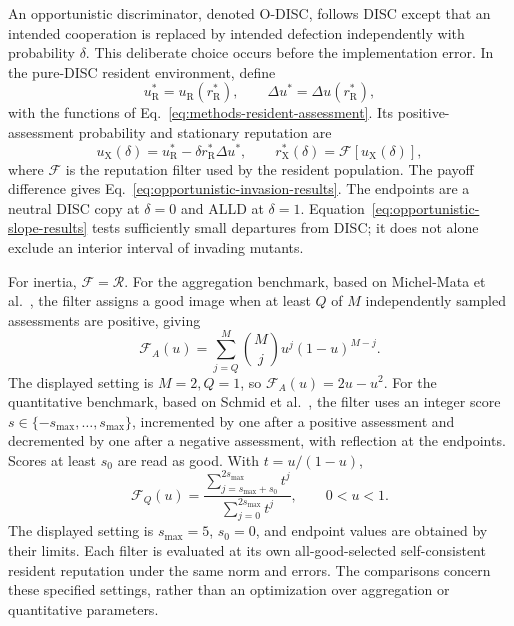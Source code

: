 \documentclass[fleqn,10pt]{article}
\begin{document}
An opportunistic discriminator, denoted O-DISC, follows DISC except that an intended cooperation is replaced by intended defection independently with probability $\delta$. This deliberate choice occurs before the implementation error. In the pure-DISC resident environment, define
\begin{equation}
u_{\mathrm R}^*=u_{\mathrm R}(r_{\mathrm R}^*),\qquad
\Delta u^*=\Delta u(r_{\mathrm R}^*),
\label{eq:methods-opportunist-assessment}
\end{equation}
with the functions of Eq.~\eqref{eq:methods-resident-assessment}.
Its positive-assessment probability and stationary reputation are
\begin{equation}
u_{\mathrm X}(\delta)=u_{\mathrm R}^*-\delta r_{\mathrm R}^*\Delta u^*,\qquad
r_{\mathrm X}^*(\delta)=\mathcal F[u_{\mathrm X}(\delta)],
\label{eq:methods-opportunist-reputation}
\end{equation}
where $\mathcal F$ is the reputation filter used by the resident population. The payoff difference gives Eq.~\eqref{eq:opportunistic-invasion-results}. The endpoints are a neutral DISC copy at $\delta=0$ and ALLD at $\delta=1$. Equation~\eqref{eq:opportunistic-slope-results} tests sufficiently small departures from DISC; it does not alone exclude an interior interval of invading mutants.

For inertia, $\mathcal F=\mathcal R$. For the aggregation benchmark, based on Michel-Mata et al.~\cite{michelmata2024}, the filter assigns a good image when at least $Q$ of $M$ independently sampled assessments are positive, giving
\begin{equation}
\mathcal F_A(u)=\sum_{j=Q}^{M}\binom Mj u^j(1-u)^{M-j}.
\label{eq:methods-aggregation-filter}
\end{equation}
The displayed setting is $M=2,Q=1$, so $\mathcal F_A(u)=2u-u^2$. For the quantitative benchmark, based on Schmid et al.~\cite{schmid2023}, the filter uses an integer score $s\in\{-s_{\max},\ldots,s_{\max}\}$, incremented by one after a positive assessment and decremented by one after a negative assessment, with reflection at the endpoints. Scores at least $s_0$ are read as good. With $t=u/(1-u)$,
\begin{equation}
\mathcal F_Q(u)=\frac{\sum_{j=s_{\max}+s_0}^{2s_{\max}}t^j}{\sum_{j=0}^{2s_{\max}}t^j},
\qquad 0<u<1.
\label{eq:methods-quantitative-filter}
\end{equation}
The displayed setting is $s_{\max}=5$, $s_0=0$, and endpoint values are obtained by their limits. Each filter is evaluated at its own all-good-selected self-consistent resident reputation under the same norm and errors. The comparisons concern these specified settings, rather than an optimization over aggregation or quantitative parameters.
\end{document}
